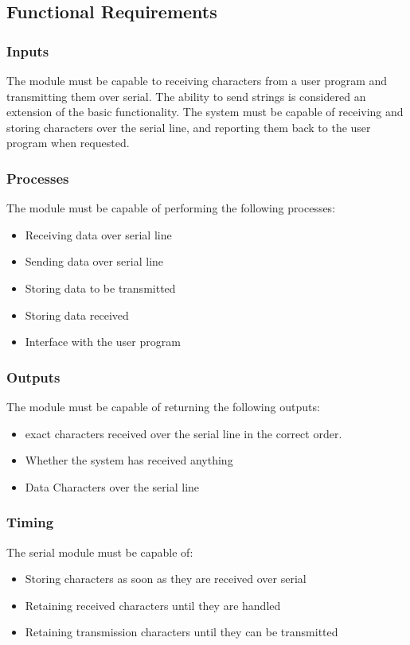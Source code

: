 \documentclass[]{report}
\begin{document}
\subsection{Functional Requirements}
\subsubsection{Inputs}
The module must be capable to receiving characters from a user program and transmitting them over serial. The ability to send strings is considered an extension of the basic functionality. \newline
The system must be capable of receiving and storing characters over the serial line, and reporting them back to the user program when requested.

\subsubsection{Processes}
The module must be capable of performing the following processes:
\begin{itemize}
	\item Receiving data over serial line
	\item Sending data over serial line
	\item Storing data to be transmitted
	\item Storing data received
	\item Interface with the user program
\end{itemize}


\subsubsection{Outputs}
The module must be capable of returning the following outputs:
\begin{itemize}
	\item exact characters received over the serial line in the correct order.
	\item Whether the system has received anything
	\item Data Characters over the serial line
\end{itemize}

\subsubsection{Timing}
The serial module must be capable of:
\begin{itemize}
	\item Storing characters as soon as they are received over serial
	\item Retaining received characters until they are handled
	\item Retaining transmission characters until they can be transmitted
\end{itemize}
\end{document}
